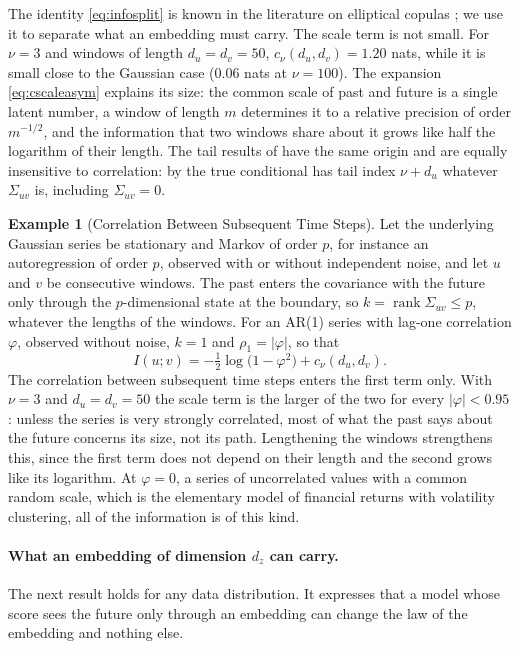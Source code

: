 \documentclass[11pt]{article}
\theoremstyle{plain}
\theoremstyle{definition}
\newtheorem{example}[theorem]{Example}
\theoremstyle{remark}
\newcommand{\abs}[1]{\left\lvert #1 \right\rvert}
\begin{document}
The identity \eqref{eq:infosplit} is known in the literature on elliptical
copulas \cite{calsaverini2009information,arellano2013shannon}; we use it to
separate what an embedding must carry. The scale term is not small. For
$\nu=3$ and windows of length $d_u=d_v=50$, $c_\nu(d_u,d_v)=1.20$ nats, while
it is small close to the Gaussian case ($0.06$ nats at $\nu=100$). The
expansion \eqref{eq:cscaleasym} explains its size: the common scale of past
and future is a single latent number, a window of length $m$ determines it
to a relative precision of order $m^{-1/2}$, and the information that two
windows share about it grows like half the logarithm of their length. The
tail results of  have the same origin and are equally
insensitive to correlation: by  the true conditional has
tail index $\nu+d_u$ whatever $\Sigma_{uv}$ is, including
$\Sigma_{uv}=0$.

\begin{example}[Correlation Between Subsequent Time Steps]
 \label{ex:ar}
 Let the underlying Gaussian series be stationary and Markov of order $p$,
 for instance an autoregression of order $p$, observed with or without
 independent noise, and let $u$ and $v$ be consecutive windows. The past
 enters the covariance with the future only through the $p$-dimensional
 state at the boundary, so $k=\operatorname{rank}\Sigma_{uv}\le p$, whatever
 the lengths of the windows. For an AR(1) series with lag-one correlation
 $\varphi$, observed without noise, $k=1$ and $\rho_1=\abs{\varphi}$, so that
 \begin{equation*}
  I(u;v)=-\tfrac12\log\bigl(1-\varphi^{2}\bigr)+c_\nu(d_u,d_v).
 \end{equation*}
 The correlation between subsequent time steps enters the first term only.
 With $\nu=3$ and $d_u=d_v=50$ the scale term is the larger of the two for
 every $\abs{\varphi}<0.95$: unless the series is very strongly correlated,
 most of what the past says about the future concerns its size, not its
 path. Lengthening the windows strengthens this, since the first term does
 not depend on their length and the second grows like its logarithm. At $\varphi=0$, a series of uncorrelated values with a common random
 scale, which is the elementary model of financial returns with volatility
 clustering, all of the information is of this kind.
\end{example}

\paragraph{What an embedding of dimension $d_z$ can carry.}
The next result holds for any data distribution. It expresses that a model
whose score sees the future only through an embedding can change the law of
the embedding and nothing else.
\end{document}
